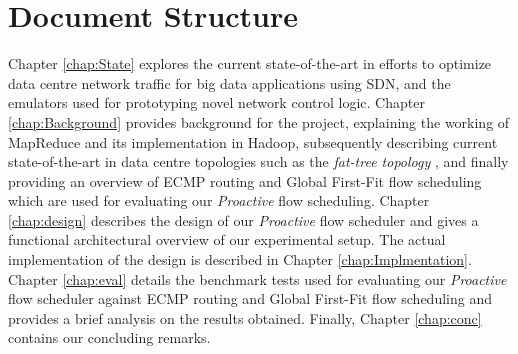 \section{Document Structure}

Chapter \ref{chap:State} explores the current state-of-the-art in efforts to optimize data centre network traffic for big data applications using SDN, and the emulators used for prototyping novel network control logic. Chapter \ref{chap:Background} provides background for the project, explaining the working of MapReduce and its implementation in Hadoop, subsequently describing current state-of-the-art in data centre topologies such as the \textit{fat-tree topology} \cite{al2008scalable}, and finally providing an overview of ECMP routing and Global First-Fit flow scheduling which are used for evaluating our \textit{Proactive} flow scheduling. Chapter \ref{chap:design} describes the design of our \textit{Proactive} flow scheduler and gives a functional architectural overview of our experimental setup. The actual implementation of the design is described in Chapter \ref{chap:Implmentation}. Chapter \ref{chap:eval} details the benchmark tests used for evaluating our \textit{Proactive} flow scheduler against ECMP routing and Global First-Fit flow scheduling and provides a brief analysis on the results obtained. Finally, Chapter \ref{chap:conc} contains our concluding remarks.  
